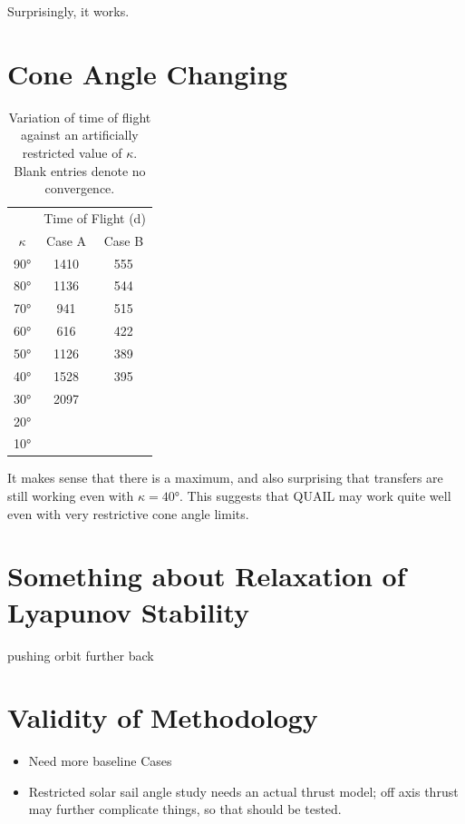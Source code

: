 Surprisingly, it works.

\section{Cone Angle Changing}
\begin{table}[H]
    \centering
    \begin{tabular}{ccc}
        \toprule
                   & \multicolumn{2}{c}{Time of Flight (d)}          \\
        \(\kappa\) & Case A                                 & Case B \\
        \midrule
        \ang{90}   & 1410                                   & 555    \\
        \ang{80}   & 1136                                   & 544    \\
        \ang{70}   & 941                                    & 515    \\
        \ang{60}   & 616                                    & 422    \\
        \ang{50}   & 1126                                   & 389    \\
        \ang{40}   & 1528                                   & 395    \\
        \ang{30}   & 2097                                   &        \\
        \ang{20}   &                                        &        \\
        \ang{10}   &                                        &        \\
        \bottomrule
    \end{tabular}
    \caption{Variation of time of flight against an artificially restricted value of \(\kappa\). Blank entries denote no convergence.}
    \label{tab:cone_angle_changing}
\end{table}

It makes sense that there is a maximum, and also surprising that transfers are still working even with \(\kappa = \ang{40}\). This suggests that QUAIL may work quite well even with very restrictive cone angle limits.


\section{Something about Relaxation of Lyapunov Stability}

pushing orbit further back

\section{Validity of Methodology}

\begin{itemize}
    \item Need more baseline Cases
    \item Restricted solar sail angle study needs an actual thrust model; off axis thrust may further complicate things, so that should be tested.
\end{itemize}